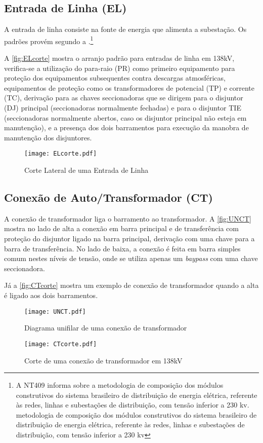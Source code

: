 		\subsection{Entrada de Linha (EL)}
			A entrada de linha consiste na fonte de energia que alimenta a subestação. Os padrões provém segundo a .\footnote{A NT409 informa sobre a metodologia de composição dos módulos construtivos do sistema brasileiro de distribuição de energia elétrica, referente às redes, linhas e subestações de distribuição, com tensão inferior a 230 kv. metodologia de composição dos módulos construtivos do sistema brasileiro de distribuição de energia elétrica, referente às redes, linhas e subestações de distribuição, com tensão inferior a 230 kv}\par
			A \autoref{fig:ELcorte} mostra o arranjo padrão para entradas de linha em 138kV, verifica-se a utilização do para-raio (PR) como primeiro equipamento para proteção dos equipamentos subsequentes contra descargas atmosféricas, equipamentos de proteção como os transformadores de potencial (TP) e corrente (TC), derivação para as chaves seccionadoras que se dirigem para o disjuntor (DJ) principal (seccionadoras normalmente fechadas) e para o disjuntor TIE (seccionadoras normalmente abertos, caso os disjuntor principal não esteja em manutenção), e a presença dos dois barramentos para execução da manobra de manutenção dos disjuntores.\par
			\begin{figure}[!b]
				\caption{Corte Lateral de uma Entrada de Linha}
				\centering
				\texttt{[image: ELcorte.pdf]}
				\label{fig:ELcorte}
				\end{figure}
		\subsection{Conexão de Auto/Transformador (CT)}
			A conexão de transformador liga o barramento ao transformador. A \autoref{fig:UNCT} mostra no lado de alta a conexão em barra principal e de transferência com proteção do disjuntor ligado na barra principal, derivação com uma chave para a barra de transferência. No lado de baixa, a conexão é feita em barra simples comum nestes níveis de tensão, onde se utiliza apenas um \textit{baypass} com uma chave seccionadora.\par
			Já a \autoref{fig:CTcorte} mostra um exemplo de conexão de transformador quando a alta é ligado aos dois barramentos.\par
			\begin{figure}[!b]
				\caption{Diagrama unifilar de uma conexão de transformador}
				\centering
				\texttt{[image: UNCT.pdf]}
				\label{fig:UNCT}
				\end{figure}
			\begin{figure}[!b]
				\caption{Corte de uma conexão de transformador em 138kV}
				\centering
				\texttt{[image: CTcorte.pdf]}
				\label{fig:CTcorte}
				\end{figure}
